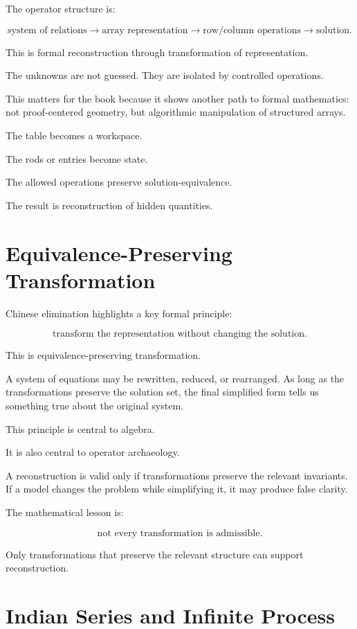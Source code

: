 \documentclass[11pt]{book}
\begin{document}
The operator structure is:

\[
\text{system of relations}
\rightarrow
\text{array representation}
\rightarrow
\text{row/column operations}
\rightarrow
\text{solution}.
\]

This is formal reconstruction through transformation of representation.

The unknowns are not guessed. They are isolated by controlled operations.

This matters for the book because it shows another path to formal mathematics: not proof-centered geometry, but algorithmic manipulation of structured arrays.

The table becomes a workspace.

The rods or entries become state.

The allowed operations preserve solution-equivalence.

The result is reconstruction of hidden quantities.

\section{Equivalence-Preserving Transformation}

Chinese elimination highlights a key formal principle:

\[
\text{transform the representation without changing the solution}.
\]

This is equivalence-preserving transformation.

A system of equations may be rewritten, reduced, or rearranged. As long as the transformations preserve the solution set, the final simplified form tells us something true about the original system.

This principle is central to algebra.

It is also central to operator archaeology.

A reconstruction is valid only if transformations preserve the relevant invariants. If a model changes the problem while simplifying it, it may produce false clarity.

The mathematical lesson is:

\[
\text{not every transformation is admissible}.
\]

Only transformations that preserve the relevant structure can support reconstruction.

\section{Indian Series and Infinite Process}
\end{document}

